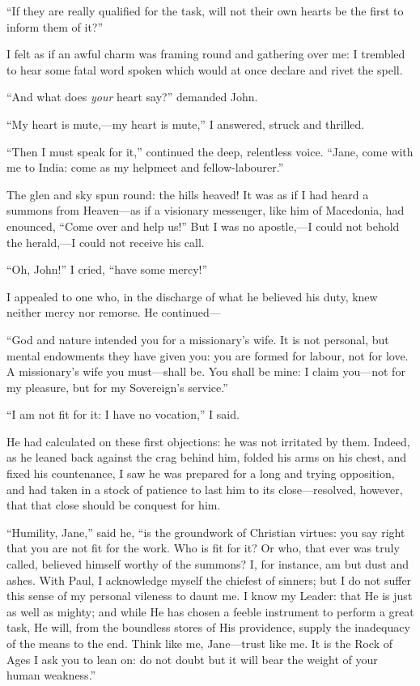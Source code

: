 \enquote{If they are really qualified for the task, will not their own
hearts be the first to inform them of it?}

I felt as if an awful charm was framing round and gathering over me: I
trembled to hear some fatal word spoken which would at once declare and
rivet the spell.

\enquote{And what does \emph{your} heart say?} demanded \St{} John.

\enquote{My heart is mute,---my heart is mute,} I answered, struck and
thrilled.

\enquote{Then I must speak for it,} continued the deep, relentless
voice. \enquote{Jane, come with me to India: come as my helpmeet and
fellow-labourer.}

The glen and sky spun round: the hills heaved! It was as if I had heard
a summons from Heaven---as if a visionary messenger, like him of
Macedonia, had enounced, \enquote{Come over and help us!} But I was no
apostle,---I could not behold the herald,---I could not receive his
call.

\enquote{Oh, \St{} John!} I cried, \enquote{have some mercy!}

I appealed to one who, in the discharge of what he believed his duty,
knew neither mercy nor remorse. He continued---

\enquote{God and nature intended you for a missionary's wife. It is not
personal, but mental endowments they have given you: you are formed for
labour, not for love. A missionary's wife you must---shall be. You
shall be mine: I claim you---not for my pleasure, but for my Sovereign's
service.}

\enquote{I am not fit for it: I have no vocation,} I said.

He had calculated on these first objections: he was not irritated by
them. Indeed, as he leaned back against the crag behind him, folded his
arms on his chest, and fixed his countenance, I saw he was prepared for
a long and trying opposition, and had taken in a stock of patience to
last him to its close---resolved, however, that that close should be
conquest for him.

\enquote{Humility, Jane,} said he, \enquote{is the groundwork of
Christian virtues: you say right that you are not fit for the work. Who
is fit for it? Or who, that ever was truly called, believed himself
worthy of the summons? I, for instance, am but dust and ashes. With
\St{} Paul, I acknowledge myself the chiefest of sinners; but I do not
suffer this sense of my personal vileness to daunt me. I know my
Leader: that He is just as well as mighty; and while He has chosen a
feeble instrument to perform a great task, He will, from the boundless
stores of His providence, supply the inadequacy of the means to the
end. Think like me, Jane---trust like me. It is the Rock of Ages I ask
you to lean on: do not doubt but it will bear the weight of your human
weakness.}


